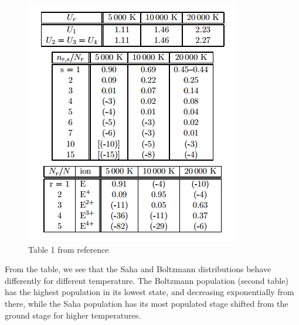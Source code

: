 \documentclass{article}
\begin{document}
\begin{figure}[H]
  \centering
  \includegraphics[scale=0.8]{table1.png}
  \caption{Table 1 from reference \cite{cite:ssa}}
\end{figure}
From the table, we see that the Saha and Boltzmann distributions behave differently for different temperature. The Boltzmann population (second table) has the highest population in its lowest state, and decreasing exponentially from there, while the Saha population has its most populated stage shifted from the ground stage for higher temperatures.\\\\
\end{document}
